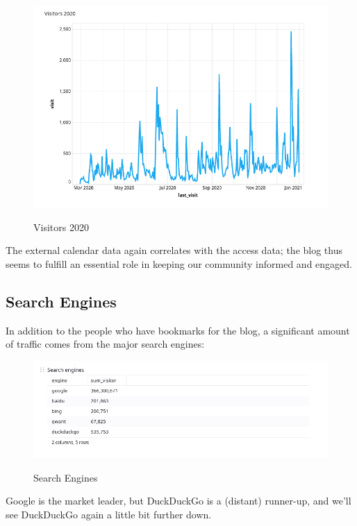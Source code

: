 \begin{figure}[H]
\centering
\caption {Visitors 2020}
\includegraphics[width=\linewidth]{images/figure02.png}
\label{fig:vistors2020}
\end{figure}

The external calendar data again correlates with the access data; the blog thus seems to fulfill an essential role in keeping our community informed and engaged.

\subsection{Search Engines}

In addition to the people who have bookmarks for the blog, a significant amount of traffic comes from the major search engines:

\begin{figure}[H]
\centering
\caption {Search Engines}
\includegraphics[width=\linewidth]{images/figure03.png}
\label{fig:searchEngines}
\end{figure}

Google is the market leader, but DuckDuckGo is a (distant) runner-up, and we'll see DuckDuckGo again a little bit further down.

